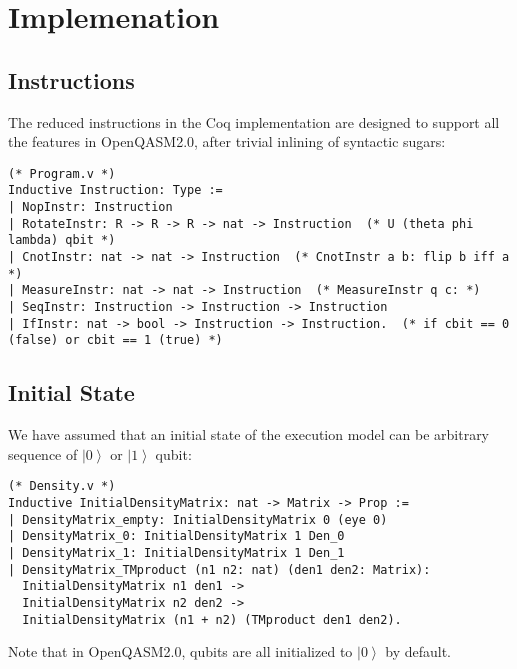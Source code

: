 \documentclass[10pt,a4paper]{article}
\newcommand{\<}{\langle}
\renewcommand{\>}{\rangle}
\newcommand{\ket}[1]{\left\vert #1 \right\>}
\begin{document}




\section{Implemenation}
\subsection{Instructions}
The reduced instructions in the Coq implementation are designed to support all
the features in OpenQASM2.0, after trivial inlining of syntactic sugars:

\begin{lstlisting}
(* Program.v *)
Inductive Instruction: Type :=
| NopInstr: Instruction
| RotateInstr: R -> R -> R -> nat -> Instruction  (* U (theta phi lambda) qbit *)
| CnotInstr: nat -> nat -> Instruction  (* CnotInstr a b: flip b iff a *)
| MeasureInstr: nat -> nat -> Instruction  (* MeasureInstr q c: *)
| SeqInstr: Instruction -> Instruction -> Instruction
| IfInstr: nat -> bool -> Instruction -> Instruction.  (* if cbit == 0 (false) or cbit == 1 (true) *)
\end{lstlisting}

\subsection{Initial State}

We have assumed that an initial state of the execution model can be arbitrary sequence of
$\ket{0}$ or $\ket{1}$ qubit:

\begin{lstlisting}
(* Density.v *)
Inductive InitialDensityMatrix: nat -> Matrix -> Prop :=
| DensityMatrix_empty: InitialDensityMatrix 0 (eye 0)
| DensityMatrix_0: InitialDensityMatrix 1 Den_0
| DensityMatrix_1: InitialDensityMatrix 1 Den_1
| DensityMatrix_TMproduct (n1 n2: nat) (den1 den2: Matrix):
  InitialDensityMatrix n1 den1 ->
  InitialDensityMatrix n2 den2 ->
  InitialDensityMatrix (n1 + n2) (TMproduct den1 den2).
\end{lstlisting}

Note that in OpenQASM2.0, qubits are all initialized to $\ket{0}$ by default.
\end{document}
